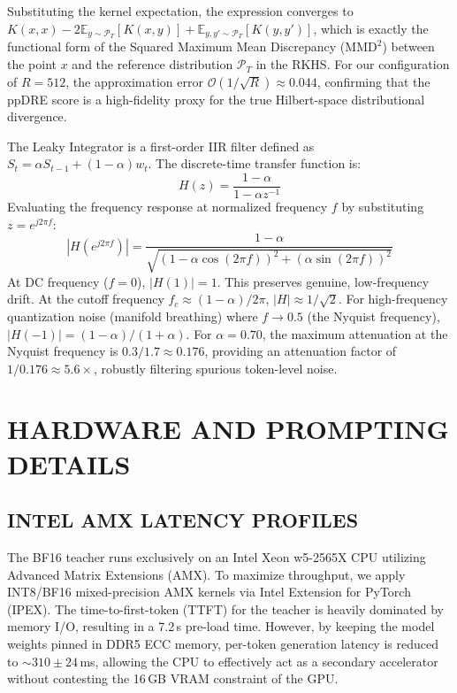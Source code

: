 \documentclass{ieeetmlcn}
\begin{document}
Substituting the kernel expectation, the expression converges to $K(x, x) - 2\mathbb{E}_{y \sim \mathcal{P}_T}[K(x, y)] + \mathbb{E}_{y, y' \sim \mathcal{P}_T}[K(y, y')]$, which is exactly the functional form of the Squared Maximum Mean Discrepancy ($\text{MMD}^2$) between the point $x$ and the reference distribution $\mathcal{P}_T$ in the RKHS. For our configuration of $R=512$, the approximation error $\mathcal{O}(1/\sqrt{R}) \approx 0.044$, confirming that the ppDRE score is a high-fidelity proxy for the true Hilbert-space distributional divergence.

The Leaky Integrator is a first-order IIR filter defined as $S_t = \alpha S_{t-1} + (1-\alpha)w_t$. The discrete-time transfer function is:
\begin{equation}
H(z) = \frac{1-\alpha}{1 - \alpha z^{-1}}
\end{equation}
Evaluating the frequency response at normalized frequency $f$ by substituting $z = e^{j2\pi f}$:
\begin{equation}
|H(e^{j2\pi f})| = \frac{1-\alpha}{\sqrt{(1-\alpha\cos(2\pi f))^2 + (\alpha\sin(2\pi f))^2}}
\end{equation}
At DC frequency ($f=0$), $|H(1)| = 1$. This preserves genuine, low-frequency drift. At the cutoff frequency $f_c \approx (1-\alpha)/2\pi$, $|H| \approx 1/\sqrt{2}$. For high-frequency quantization noise (manifold breathing) where $f \to 0.5$ (the Nyquist frequency), $|H(-1)| = (1-\alpha)/(1+\alpha)$. 
For $\alpha=0.70$, the maximum attenuation at the Nyquist frequency is $0.3 / 1.7 \approx 0.176$, providing an attenuation factor of $1/0.176 \approx 5.6\times$, robustly filtering spurious token-level noise.

\section{HARDWARE AND PROMPTING DETAILS}
\label{app:hardware}
\subsection{INTEL AMX LATENCY PROFILES}
The BF16 teacher runs exclusively on an Intel Xeon w5-2565X CPU utilizing Advanced Matrix Extensions (AMX). To maximize throughput, we apply INT8/BF16 mixed-precision AMX kernels via Intel Extension for PyTorch (IPEX). The time-to-first-token (TTFT) for the teacher is heavily dominated by memory I/O, resulting in a 7.2\,s pre-load time. However, by keeping the model weights pinned in DDR5 ECC memory, per-token generation latency is reduced to $\sim\!310\pm24$\,ms, allowing the CPU to effectively act as a secondary accelerator without contesting the 16\,GB VRAM constraint of the GPU.
\end{document}
